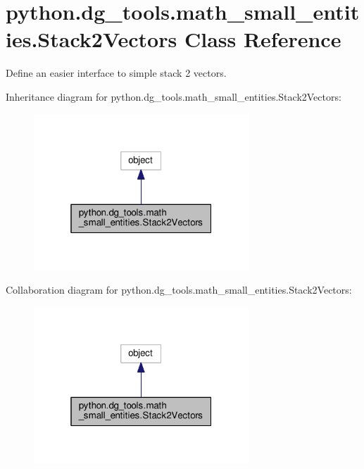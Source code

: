 \hypertarget{classpython_1_1dg__tools_1_1math__small__entities_1_1Stack2Vectors}{}\section{python.\+dg\+\_\+tools.\+math\+\_\+small\+\_\+entities.\+Stack2\+Vectors Class Reference}
\label{classpython_1_1dg__tools_1_1math__small__entities_1_1Stack2Vectors}


Define an easier interface to simple stack 2 vectors.  




Inheritance diagram for python.\+dg\+\_\+tools.\+math\+\_\+small\+\_\+entities.\+Stack2\+Vectors\+:
\nopagebreak
\begin{figure}[H]
\begin{center}
\leavevmode
\includegraphics[width=229pt]{classpython_1_1dg__tools_1_1math__small__entities_1_1Stack2Vectors__inherit__graph}
\end{center}
\end{figure}


Collaboration diagram for python.\+dg\+\_\+tools.\+math\+\_\+small\+\_\+entities.\+Stack2\+Vectors\+:
\nopagebreak
\begin{figure}[H]
\begin{center}
\leavevmode
\includegraphics[width=229pt]{classpython_1_1dg__tools_1_1math__small__entities_1_1Stack2Vectors__coll__graph}
\end{center}
\end{figure}
